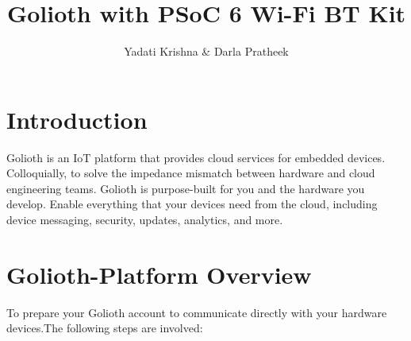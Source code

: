 \documentclass[journal,5pt,twocolumn]{IEEEtran}
\renewcommand\thesection{\arabic{section}}
\begin{document}
\let\StandardTheFigure\thefigure
\let\StandardTheFigure\thefigure
\let\StandardTheTable\thetable
\let\vec\mathbf
\def\putbox#1#2#3{\makebox[0in][l]{\makebox[#1][l]{}\raisebox{\baselineskip}[0in][0in]{\raisebox{#2}[0in][0in]{#3}}}}
     \def\rightbox#1{\makebox[0in][r]{#1}}
     \def\centbox#1{\makebox[0in]{#1}}
     \def\topbox#1{\raisebox{-\baselineskip}[0in][0in]{#1}}
     \def\midbox#1{\raisebox{-0.5\baselineskip}[0in][0in]{#1}}
\title{ 
Golioth with PSoC 6 Wi-Fi BT  Kit 
}
\author{Yadati Krishna \& Darla Pratheek}%
\maketitle
\tableofcontents
\section{\textbf{Introduction}}
Golioth is an IoT platform that provides cloud services for embedded devices. Colloquially, to solve the impedance mismatch between hardware and cloud engineering teams. Golioth is purpose-built for you and the hardware you develop. Enable everything that your devices need from the cloud, including device messaging, security, updates, analytics, and more.
\section{\textbf{Golioth-Platform Overview}}
To prepare your Golioth account to communicate directly with your hardware devices.The following steps are involved:
\end{document}
